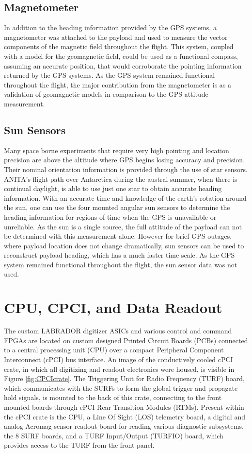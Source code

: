 	\subsection{Magnetometer}
		In addition to the heading information provided by the GPS systems, a magnetometer was attached to the payload and used to measure the vector components of the magnetic field throughout the flight.  This system, coupled with a model for the geomagnetic field, could be used as a functional compass, assuming an accurate position, that would corroborate the pointing information returned by the GPS systems.  As the GPS system remained functional throughout the flight, the major contribution from the magnetometer is as a validation of geomagnetic models in comparison to the GPS attitude measurement.
		
	\subsection{Sun Sensors}
		Many space borne experiments that require very high pointing and location precision are above the altitude where GPS begins losing accuracy and precision.  Their nominal orientation information is provided through the use of star sensors.  ANITA's flight path over Antarctica during the austral summer, when there is continual daylight, is able to use just one star to obtain accurate heading information.  With an accurate time and knowledge of the earth's rotation around the sun, one can use the four mounted angular sun sensors to determine the heading information for regions of time when the GPS is unavailable or unreliable.  As the sun is a single source, the full attitude of the payload can not be determined with this measurement alone. However for brief GPS outages, where payload location does not change dramatically, sun sensors can be used to reconstruct payload heading, which has a much faster time scale.  As the GPS system remained functional throughout the flight, the sun sensor data was not used.
		
\section{CPU, CPCI, and Data Readout}
	The custom LABRADOR digitizer ASICs and various control and command FPGAs are located on custom designed Printed Circuit Boards (PCBs) connected to a central processing unit (CPU) over a compact Peripheral Component Interconnect (cPCI) bus interface.  An image of the conductively cooled cPCI crate, in which all digitizing and readout electronics were housed, is visible in Figure \ref{fig:CPCIcrate}.  The Triggering Unit for Radio Frequency (TURF) board, which communicates with the SURFs to form the global trigger and propagate hold signals, is mounted to the back of this crate, connecting to the front mounted boards through cPCI Rear Transition Modules (RTMs).  Present within the cPCI crate is the CPU, a Line Of Sight (LOS) telemetry board, a digital and analog Acromag sensor readout board for reading various diagnostic subsystems, the 8 SURF boards,  and a TURF Input/Output (TURFIO) board, which provides access to the TURF from the front panel.
	
